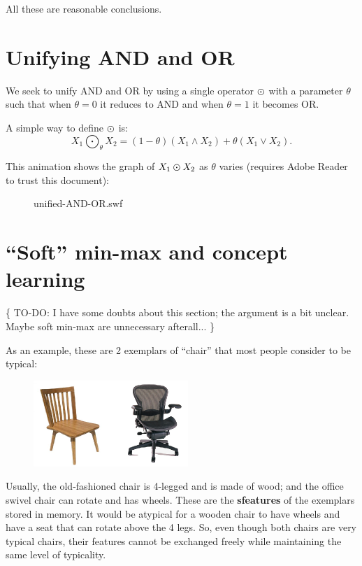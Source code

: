 All these are reasonable conclusions.

\section{Unifying AND and OR}
\label{sec:unifying-AND-and-OR}
We seek to unify AND and OR by using a single operator $\varodot$ with a parameter $\theta$ such that when $\theta = 0$ it reduces to AND and when $\theta = 1$ it becomes OR.

A simple way to define $\varodot$ is:
\begin{equation}
X_1 \bigodot_\theta X_2 = (1-\theta) (X_1 \wedge X_2) + \theta (X_1 \vee X_2).
\end{equation}

This animation shows the graph of $X_1 \varodot X_2$ as $\theta$ varies (requires Adobe Reader to trust this document):

\begin{figure}[ht]
{unified-AND-OR.swf}
\end{figure}

\section{``Soft'' min-max and concept learning}

\{ TO-DO:  I have some doubts about this section; the argument is a bit unclear.  Maybe soft min-max are unnecessary afterall... \}

As an example, these are 2 exemplars of ``chair'' that most people consider to be typical:
\begin{figure}[H]
\centering
\includegraphics{2-chairs.png}
\end{figure}
Usually, the old-fashioned chair is 4-legged and is made of wood; and the office swivel chair can rotate and has wheels.  These are the \textbf{sfeatures} of the exemplars stored in memory.  It would be atypical for a wooden chair to have wheels and have a seat that can rotate above the 4 legs.  So, even though both chairs are very typical chairs, their features cannot be exchanged freely while maintaining the same level of typicality.

